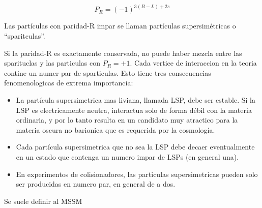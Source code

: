 \begin{equation}
  P_R = (-1)^{3(B-L)+ 2s}
\end{equation}

Las partículas con paridad-R impar se llaman partículas supersimétricas o ``sparitculas''.

Si la paridad-R es exactamente conservada, no puede haber mezcla entre las sparituclas y las
particulas con $P_R = +1$. Cada vertice de interaccion en la teoria contine un numer par de
sparticulas. Esto tiene tres consecuencias fenomenologicas de extrema importancia:

\begin{itemize}
\item La part\'icula supersimetrica mas liviana, llamada LSP, debe ser estable. Si la LSP es
  electricamente neutra, interactua solo de forma d\'ebil con la materia ordinaria, y por lo tanto
  resulta en un candidato muy atractico para la materia oscura no barionica que es requerida por
  la cosmolog\'ia.
\item Cada part\'icula supersimetrica que no sea la LSP debe decaer eventualmente en un estado que
  contenga un numero impar de LSPs (en general una).
\item En experimentos de colisionadores, las particulas supersimetricas pueden solo ser producidas
  en numero par, en general de a dos.
\end{itemize}


Se suele definir al  MSSM









\begin{tikzpicture}



\end{tikzpicture}




